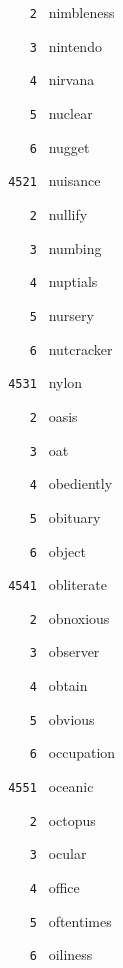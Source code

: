 \documentclass[11pt]{article}
\begin{document}
\begin{multicols}{6}
\noindent \texttt{ \ \ \ 2 } nimbleness  \par
\noindent \texttt{ \ \ \ 3 } nintendo  \par
\noindent \texttt{ \ \ \ 4 } nirvana  \par
\noindent \texttt{ \ \ \ 5 } nuclear  \par
\noindent \texttt{ \ \ \ 6 } nugget  \par
\vspace{3mm}
\noindent \texttt{ 4521 } nuisance  \par
\noindent \texttt{ \ \ \ 2 } nullify  \par
\noindent \texttt{ \ \ \ 3 } numbing  \par
\noindent \texttt{ \ \ \ 4 } nuptials  \par
\noindent \texttt{ \ \ \ 5 } nursery  \par
\noindent \texttt{ \ \ \ 6 } nutcracker  \par
\vspace{3mm}
\noindent \texttt{ 4531 } nylon  \par
\noindent \texttt{ \ \ \ 2 } oasis  \par
\noindent \texttt{ \ \ \ 3 } oat  \par
\noindent \texttt{ \ \ \ 4 } obediently  \par
\noindent \texttt{ \ \ \ 5 } obituary  \par
\noindent \texttt{ \ \ \ 6 } object  \par
\vspace{3mm}
\noindent \texttt{ 4541 } obliterate  \par
\noindent \texttt{ \ \ \ 2 } obnoxious  \par
\noindent \texttt{ \ \ \ 3 } observer  \par
\noindent \texttt{ \ \ \ 4 } obtain  \par
\noindent \texttt{ \ \ \ 5 } obvious  \par
\noindent \texttt{ \ \ \ 6 } occupation  \par
\vspace{3mm}
\noindent \texttt{ 4551 } oceanic  \par
\noindent \texttt{ \ \ \ 2 } octopus  \par
\noindent \texttt{ \ \ \ 3 } ocular  \par
\noindent \texttt{ \ \ \ 4 } office  \par
\noindent \texttt{ \ \ \ 5 } oftentimes  \par
\noindent \texttt{ \ \ \ 6 } oiliness  \par

\end{multicols}
\end{document}
